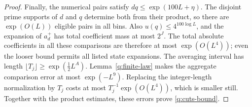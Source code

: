 \begin{proof}
Finally, the numerical pairs satisfy $dq\le\exp(100L+\eta)$.
The disjoint prime supports of $d$ and $q$ determine both from their
product, so there are $\exp(O(L))$ eligible pairs in all bins.  Also
$u(q)\le4^{100\log L}$, and the expansion of $a_d^+$ has total
coefficient mass at most $2^J$.  The total absolute coefficients in all
these comparisons are therefore at most $\exp(O(L^4))$; even the looser
bound permits all listed state expansions.  The averaging interval has
length $\lfloor T_j\rfloor\ge\exp(\tfrac12L^A)$.
Lemma~\ref{q:finite-law} makes the aggregate comparison error at most
$\exp(-L^9)$.  Replacing the integer-length normalization by $T_j$ costs
at most $T_j^{-1}\exp(O(L^4))$, which is smaller still.
Together with the product estimates, these errors prove
\eqref{q:cuts-bound}.
\end{proof}
